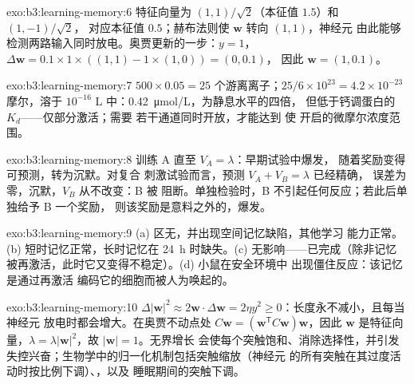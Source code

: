 \begin{solution}{exo:b3:learning-memory:6}
特征向量为 $(1,1)/\sqrt{2}$（本征值 $1.5$）和 $(1,-1)/\sqrt{2}$，
对应本征值 $0.5$；赫布法则使 $\mathbf{w}$ 转向 $(1,1)$，神经元
由此能够检测两路输入同时放电。奥贾更新的一步：$y = 1$，
$\Delta\mathbf{w} = 0.1\times 1\times((1,1) - 1\times(1,0)) = (0,0.1)$，
因此 $\mathbf{w} = (1, 0.1)$。
\end{solution}

\begin{solution}{exo:b3:learning-memory:7}
$500\times 0.05 = 25$ 个游离离子；$25/6\times 10^{23} = 4.2\times 10^{-23}$
摩尔，溶于 $10^{-16}$ L 中：\qty{0.42}{\micro mol/L}，为静息水平的四倍，
但低于钙调蛋白的 $K_{d}$——仅部分激活；需要
若干通道同时开放，才能达到
使  开启的微摩尔浓度范围。
\end{solution}

\begin{solution}{exo:b3:learning-memory:8}
训练 A 直至 $V_{A} = \lambda$：早期试验中爆发，
随着奖励变得可预测，转为沉默。对复合
刺激试验而言，预测 $V_{A} + V_{B} = \lambda$ 已经精确，
误差为零，沉默，$V_{B}$ 从不改变：B 被
阻断。单独检验时，B 不引起任何反应；若此后单独给予 B 一个奖励，
则该奖励是意料之外的，爆发。
\end{solution}

\begin{solution}{exo:b3:learning-memory:9}
(a)  区无，并出现空间记忆缺陷，其他学习
能力正常。(b) 短时记忆正常，长时记忆在
\qty{24}{h} 时缺失。(c) 无影响——已完成（除非记忆
被再激活，此时它又变得不稳定）。(d) 小鼠在安全环境中
出现僵住反应：该记忆是通过再激活
编码它的细胞而被人为唤起的。
\end{solution}

\begin{solution}{exo:b3:learning-memory:10}
$\Delta|\mathbf{w}|^{2} \approx 2\mathbf{w}\cdot\Delta\mathbf{w} = 2\eta
y^{2} \ge 0$：长度永不减小，且每当神经元
放电时都会增大。在奥贾不动点处 $C\mathbf{w} = (\mathbf{w}^{\mathsf{T}}C
\mathbf{w})\mathbf{w}$，因此 $\mathbf{w}$ 是特征向量，$\lambda =
\lambda|\mathbf{w}|^{2}$，故 $|\mathbf{w}| = 1$。无界增长
会使每个突触饱和、消除选择性，并引发
失控兴奋；生物学中的归一化机制包括突触缩放（神经元
的所有突触在其过度活动时按比例下调）、，以及
睡眠期间的突触下调。
\end{solution}

